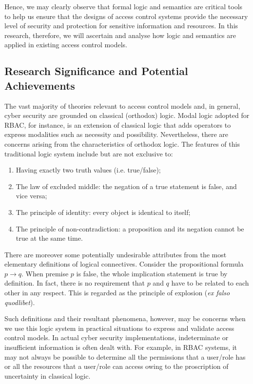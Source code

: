 \documentclass{article}
\begin{document}
Hence, we may clearly observe that formal logic and semantics are critical
tools to help us ensure that the designs of access control systems provide
the necessary level of security and protection for sensitive information
and resources. In this research, therefore, we will ascertain and analyse
how logic and semantics are applied in existing access control models.

\subsection*{Research Significance and Potential Achievements}

The vast majority of theories relevant to access control models and, in
general, cyber security are grounded on classical (orthodox) logic. Modal
logic adopted for RBAC, for instance, is an extension of classical
logic that adds operators to express modalities such as necessity and
possibility. Nevertheless, there are concerns arising from the characteristics
of orthodox logic. The features of this traditional logic system include
but are not exclusive to:\cite{classical-logic} \begin{enumerate}
    \item Having exactly two truth values (i.e. true/false); \item The law
    of excluded middle: the negation of a true statement is false, and vice
    versa; \item The principle of identity: every object is identical to
    itself; \item The principle of non-contradiction: a proposition and its
    negation cannot be true at the same time.
\end{enumerate}

There are moreover some potentially undesirable attributes from the most
elementary definitions of logical connectives. Consider the propositional
formula $p \to q$. When premise $p$ is false, the whole implication statement
is true by definition. In fact, there is no requirement that $p$ and $q$
have to be related to each other in any respect. This is regarded as the
principle of explosion (\textit{ex falso quodlibet}).

Such definitions and their resultant phenomena, however, may be concerns when
we use this logic system in practical situations to express and validate access
control models. In actual cyber security implementations, indeterminate or
insufficient information is often dealt with. For example, in RBAC systems,
it may not always be possible to determine all the permissions that a user/role
has or all the resources that a user/role can access owing to the proscription
of uncertainty in classical logic.
\end{document}
